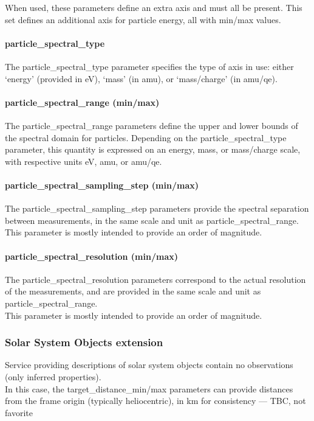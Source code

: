 \documentclass[11pt,a4paper]{ivoa}
\begin{document}
When used, these parameters define an extra axis and must all be present.
This set defines an additional axis for particle energy,
all with min/max values.

\paragraph{particle\_spectral\_type}

The particle\_spectral\_type parameter specifies the type of axis in use:
either `energy' (provided in eV), `mass' (in amu), or `mass/charge'
(in amu/qe).

\paragraph{particle\_spectral\_range (min/max)}

The particle\_spectral\_range parameters define the upper and
lower bounds of the spectral domain for particles. Depending on the
particle\_spectral\_type parameter, this quantity is expressed on an
energy, mass, or mass/charge scale, with respective units eV, amu,
or amu/qe.

\paragraph{particle\_spectral\_sampling\_step (min/max)}

The particle\_spectral\_sampling\_step parameters provide the
spectral separation between measurements, in the same scale and unit as
particle\_spectral\_range.\\
This parameter is mostly intended to provide an order of magnitude.

\paragraph{particle\_spectral\_resolution (min/max)}

The particle\_spectral\_resolution parameters correspond to the actual
resolution of the measurements, and are provided in the same scale and
unit as particle\_spectral\_range. \\
This parameter is mostly intended to provide an order of magnitude.

\subsubsection{Solar System Objects extension}

Service providing descriptions of solar system objects contain
no observations (only inferred properties).\\
In this case, the target\_distance\_min/max parameters
can provide distances from the frame origin (typically heliocentric),
in km for consistency --- TBC, not favorite
\end{document}
